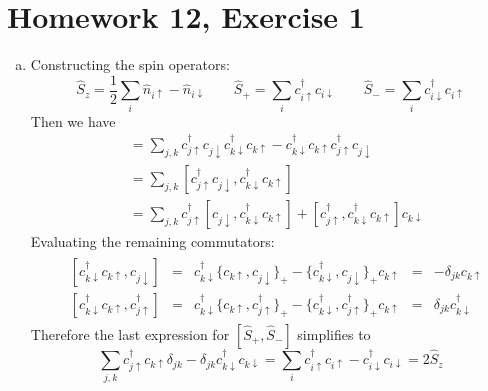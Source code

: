 \documentclass{article}
\begin{document}
\section{Homework 12, Exercise 1}
\begin{enumerate}[a)]
\item 
Constructing the spin operators: 
\begin{equation*} 
\hat{S}_z = \frac{1}{2}\sum_{i} \hat{n}_{i\uparrow} - \hat{n}_{i\downarrow} \qquad \hat{S}_+ = \sum_{i} c_{i\uparrow}^{\dagger} c_{i \downarrow} \qquad \hat{S}_- = \sum_{i} c_{i\downarrow}^{\dagger} c_{i \uparrow}
\end{equation*}
Then we have 
\begin{align*}
[\hat{S}_+, \hat{S}_-] &= \sum_{j,k} c_{j \uparrow}^\dagger c_{j \downarrow} c_{k \downarrow}^\dagger c_{k \uparrow} - c_{k \downarrow}^\dagger c_{k \uparrow} c_{j \uparrow}^\dagger c_{j \downarrow} \\
&= \sum_{j,k} [c_{j \uparrow}^\dagger c_{j \downarrow} , c_{k \downarrow}^\dagger c_{k \uparrow} ] \\
&= \sum_{j,k} c_{j \uparrow}^\dagger [c_{j \downarrow}, c_{k \downarrow}^\dagger c_{k \uparrow}] + [c_{j \uparrow}^\dagger, c_{k\downarrow}^\dagger c_{k \uparrow} ] c_{k \downarrow}
\end{align*}
Evaluating the remaining commutators:
\begin{align*}
\begin{aligned}
& [c_{k \downarrow}^\dagger c_{k \uparrow}, c_{j \downarrow}] &=& c_{k \downarrow}^\dagger \{ c_{k\uparrow}, c_{j\downarrow}\}_+ - \{c_{k\downarrow}^\dagger, c_{j\downarrow}\}_+ c_{k\uparrow} &=& -\delta_{jk}c_{k\uparrow} \\
& [c_{k \downarrow}^\dagger c_{k \uparrow}, c_{j \uparrow}^\dagger] &=& c_{k \downarrow}^\dagger \{ c_{k\uparrow},c_{j \uparrow}^\dagger\}_+ - \{c_{k\downarrow}^\dagger, c_{j \uparrow}^\dagger\}_+ c_{k\uparrow} &=& \delta_{jk}c_{k\downarrow}^\dagger
\end{aligned}
\end{align*}
Therefore the last expression for $[\hat{S}_+, \hat{S}_-]$ simplifies to 
\begin{equation*}
 \sum_{j,k} c_{j \uparrow}^\dagger c_{k\uparrow}\delta_{jk} - \delta_{jk}c_{k\downarrow}^\dagger c_{k \downarrow} = \sum_{i} c_{i \uparrow}^\dagger c_{i \uparrow} - c_{i \downarrow}^\dagger c_{i \downarrow} = 2\hat{S}_z
\end{equation*}


\end{enumerate}
\end{document}
